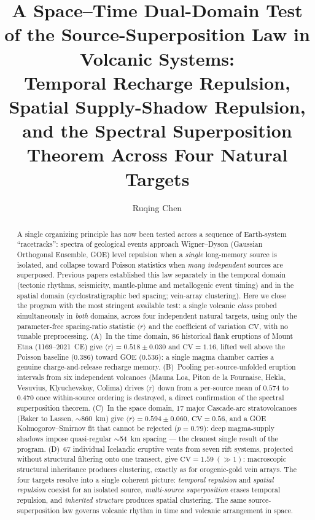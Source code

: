 \documentclass[11pt]{article}
\title{\bfseries A Space--Time Dual-Domain Test of the Source-Superposition
Law in Volcanic Systems:\\
Temporal Recharge Repulsion, Spatial Supply-Shadow Repulsion,\\
and the Spectral Superposition Theorem Across Four Natural Targets}
\author[1]{Ruqing Chen}
\affil[1]{GUT Geoservice Inc., Montreal, Quebec, Canada \\ \texttt{ruqing@hotmail.com}}
\date{}
\begin{document}
\maketitle

\begin{abstract}
\noindent
A single organizing principle has now been tested across a sequence of
Earth-system ``racetracks'': spectra of geological events approach
Wigner--Dyson (Gaussian Orthogonal Ensemble, GOE) level repulsion when a
\emph{single} long-memory source is isolated, and collapse toward Poisson
statistics when \emph{many independent} sources are superposed. Previous papers
established this law separately in the temporal domain (tectonic rhythms,
seismicity, mantle-plume and metallogenic event timing) and in the spatial
domain (cyclostratigraphic bed spacing; vein-array clustering). Here we close
the program with the most stringent available test: a single volcanic
\emph{class} probed simultaneously in \emph{both} domains, across four
independent natural targets, using only the parameter-free spacing-ratio
statistic $\langle r\rangle$ and the coefficient of variation $\mathrm{CV}$,
with no tunable preprocessing. (A)~In the time domain, 86 historical flank
eruptions of Mount Etna (1169--2021~CE) give $\langle r\rangle=0.518\pm0.030$
and $\mathrm{CV}=1.16$, lifted well above the Poisson baseline ($0.386$) toward
GOE ($0.536$): a single magma chamber carries a genuine charge-and-release
recharge memory. (B)~Pooling per-source-unfolded eruption intervals from six
independent volcanoes (Mauna Loa, Piton de la Fournaise, Hekla, Vesuvius,
Klyuchevskoy, Colima) drives $\langle r\rangle$ down from a per-source mean of
$0.574$ to $0.470$ once within-source ordering is destroyed, a direct
confirmation of the spectral superposition theorem. (C)~In the space domain, 17
major Cascade-arc stratovolcanoes (Baker to Lassen, $\sim$860~km) give
$\langle r\rangle=0.594\pm0.060$, $\mathrm{CV}=0.56$, and a GOE
Kolmogorov--Smirnov fit that cannot be rejected ($p=0.79$): deep magma-supply
shadows impose quasi-regular $\sim$54~km spacing --- the cleanest single result
of the program. (D)~67 individual Icelandic eruptive vents from seven rift
systems, projected without structural filtering onto one transect, give
$\mathrm{CV}=1.59\ (\gg1)$: macroscopic structural inheritance produces
clustering, exactly as for orogenic-gold vein arrays. The four targets resolve
into a single coherent picture: \emph{temporal repulsion} and \emph{spatial
repulsion} coexist for an isolated source, \emph{multi-source superposition}
erases temporal repulsion, and \emph{inherited structure} produces spatial
clustering. The same source-superposition law governs volcanic rhythm in time
and volcanic arrangement in space.
\end{abstract}
\end{document}
